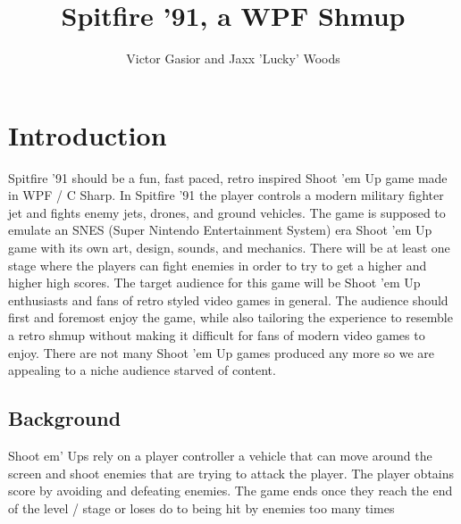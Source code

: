 \documentclass[10pt,conference,onecolumn,compsoc]{IEEEtran}
\begin{document}
\title{Spitfire '91, a WPF Shmup}
%
%


\author{Victor Gasior and Jaxx 'Lucky' Woods
}



\maketitle



\IEEEdisplaynontitleabstractindextext

\IEEEpeerreviewmaketitle



\section{Introduction}
Spitfire '91 should be a fun, fast paced, retro inspired Shoot 'em Up game made in WPF / C Sharp. In Spitfire '91 the player controls a modern military fighter jet and fights enemy jets, drones, and ground vehicles. The game is supposed to emulate an SNES (Super Nintendo Entertainment System) era Shoot 'em Up game with its own art, design, sounds, and mechanics. There will be at least one stage where the players can fight enemies in order to try to get a higher and higher high scores. The target audience for this game will be Shoot 'em Up enthusiasts and fans of retro styled video games in general. The audience should first and foremost enjoy the game, while also tailoring the experience to resemble a retro shmup without making it difficult for fans of modern video games to enjoy.  There are not many Shoot 'em Up games produced any more so we are appealing to a niche audience starved of content.



\subsection{Background}
Shoot em' Ups rely on a player controller a vehicle that can move around the screen and shoot enemies that are trying to attack the player. The player obtains score by avoiding and defeating enemies. The game ends once they reach the end of the level / stage or loses do to being hit by enemies too many times
\end{document}
